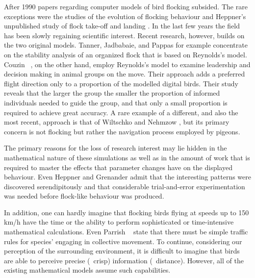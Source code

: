 After 1990 papers regarding computer models of bird flocking subsided. The rare exceptions were the studies of the evolution of flocking behaviour \cite{reynolds:1993a,reynolds:1993b,reynolds:1994,spector:2002,spector:2003} and Heppner's unpublished study of flock take-off and landing \cite{heppner:1997}. In the last few years the field has been slowly regaining scientific interest. Recent research, however, builds on the two original models. Tanner, Jadbabaie, and Pappas \cite{tanner:2003a,tanner:2003b} for example concentrate on the stability analysis of an organized flock that is based on Reynolds's model. Couzin \etal\ \cite{couzin:2005}, on the other hand, employ Reynolds's model to examine leadership and decision making in animal groups on the move. Their approach adds a preferred flight direction only to a proportion of the modelled digital birds. Their study reveals that the larger the group the smaller the proportion of informed individuals needed to guide the group, and that only a small proportion is required to achieve great accuracy. A rare example of a different, and also the most recent, approach is that of Wiltschko and Nehmzow \cite{wiltschko:2005}, but its primary concern is not flocking but rather the navigation process employed by pigeons.

The primary reasons for the loss of research interest may lie hidden in the mathematical nature of these simulations as well as in the amount of work that is required to master the effects that parameter changes have on the displayed behaviour. Even Heppner and Grenander \cite{heppner:1990} admit that the interesting patterns were discovered serendipitously and that considerable trial-and-error experimentation was needed before flock-like behaviour was produced.

In addition, one can hardly imagine that flocking birds flying at speeds up to 150\,km/h \cite{heppner:1997} have the time or the ability to perform sophisticated or time-intensive mathematical calculations. Even Parrish \etal\ \cite{parrish:1997a} state that there must be simple traffic rules for species' engaging in collective movement. To continue, considering our perception of the surrounding environment, it is difficult to imagine that birds are able to perceive precise (\ie\ crisp) information (\eg\ distance). However, all of the existing mathematical models assume such capabilities.

